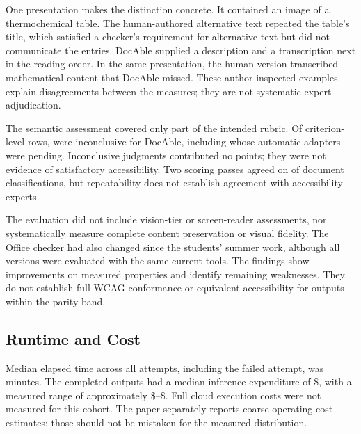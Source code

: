 One presentation makes the distinction concrete. It contained an image of a thermochemical table. The human-authored alternative text repeated the table's title, which satisfied a checker's requirement for alternative text but did not communicate the entries. DocAble supplied a description and a transcription next in the reading order. In the same presentation, the human version transcribed mathematical content that DocAble missed. These author-inspected examples explain disagreements between the measures; they are not systematic expert adjudication.


The semantic assessment covered only part of the intended rubric. Of  criterion-level rows,  were inconclusive for DocAble, including  whose automatic adapters were pending. Inconclusive judgments contributed no points; they were not evidence of satisfactory accessibility. Two scoring passes agreed on  of  document classifications, but repeatability does not establish agreement with accessibility experts.

The evaluation did not include vision-tier or screen-reader assessments, nor systematically measure complete content preservation or visual fidelity. The Office checker had also changed since the students' summer work, although all versions were evaluated with the same current tools. The findings show improvements on measured properties and identify remaining weaknesses. They do not establish full WCAG conformance or equivalent accessibility for outputs within the parity band.

\subsection{Runtime and Cost}\label{heading:runtime-and-cost}


Median elapsed time across all  attempts, including the failed attempt, was  minutes. The  completed outputs had a median inference expenditure of \$, with a measured range of approximately \$--\$. Full cloud execution costs were not measured for this cohort. The paper separately reports coarse operating-cost estimates; those should not be mistaken for the measured distribution\citep{davis2026docable}.

